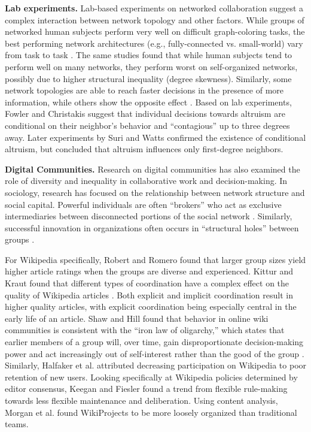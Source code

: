 {\bf Lab experiments.} Lab-based experiments on networked collaboration
suggest a complex interaction between network topology and other factors.
While groups of networked human subjects perform very well on
difficult graph-coloring tasks, the best performing network architectures
(e.g., fully-connected vs. small-world) vary
from task to task \cite{kearns_experiments_2012}.
The same studies found that while human subjects tend to perform well on
many networks, they perform worst on self-organized
networks, possibly due to higher structural inequality
(degree skewness).
Similarly, some network topologies are able to reach faster decisions in the
presence of more information, while others show the opposite effect
\cite{kearns_experimental_2006}.
Based on lab experiments, Fowler and Christakis 
suggest that individual decisions towards altruism are conditional on their
neighbor's behavior and ``contagious'' up to three degrees away.
Later experiments by Suri and Watts  confirmed the
existence of conditional altruism,
but concluded that altruism
influences only first-degree neighbors.

{\bf Digital Communities.}
Research on digital communities has also examined the role of 
diversity and inequality
in collaborative work and decision-making.
In sociology, research has focused on the relationship between
network structure and social capital.
Powerful individuals are often ``brokers''
who act as exclusive intermediaries between disconnected portions of the
social network \cite{silverman_patronage_1965}.
Similarly, successful innovation in organizations often occurs in ``structural
holes'' between groups \cite{granovetter_strength_1973}.

For Wikipedia specifically,
Robert and Romero  found that
larger group sizes yield higher article ratings
when the groups are diverse and experienced. Kittur and Kraut found that different types of coordination have a complex
effect on the quality of Wikipedia articles .
Both explicit and implicit coordination result in higher quality articles,
with explicit coordination being especially central in the early life of an
article.
Shaw and Hill 
found that behavior in online wiki communities is consistent
with the ``iron law of oligarchy,''
which states that
earlier members of a group will, over time, gain disproportionate
decision-making power and act increasingly out of self-interest rather than
the good of the group \cite{michels_political_1999}.
Similarly, Halfaker et al.  attributed decreasing
participation on Wikipedia to poor retention of new users.
Looking specifically at Wikipedia policies determined by editor consensus,
Keegan and Fiesler  found a trend
from flexible rule-making towards less flexible maintenance and deliberation.
Using content analysis,
Morgan et al.  found WikiProjects to be
more loosely organized than traditional teams.

